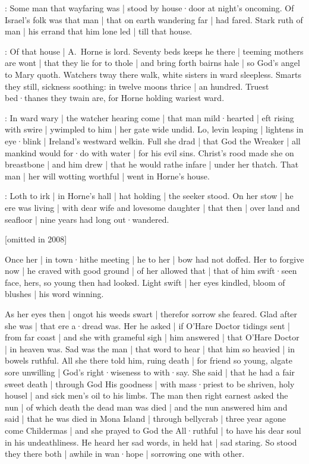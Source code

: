 

:
Some man that wayfaring was |
stood by house·door at night's oncoming.
Of Israel's folk was that man |
that on earth wandering far |
had fared.
Stark ruth of man |
his errand that him lone led |
till that house.


:
Of that house |
A.~Horne is lord.
Seventy beds keeps he there |
teeming mothers are wont |
that they lie for to thole |
and bring forth bairns hale |
so God's angel to Mary quoth.
Watchers tway there walk,
white sisters in ward sleepless.
Smarts they still,
sickness soothing:
in twelve moons thrice |
an hundred.
Truest bed·thanes they twain are,
for Horne holding wariest ward.


:
In ward wary |
the watcher hearing come |
that man mild·hearted |
eft rising with swire |
ywimpled to him |
her gate wide undid.
Lo,
levin leaping |
lightens in eye·blink |
Ireland's westward welkin.
Full she drad |
that God the Wreaker |
all mankind would for·do with water |
for his evil sins.
Christ's rood made she on breastbone |
and him drew |
that he would rathe infare |
under her thatch.
That man |
her will wotting worthful |
went in Horne's house.



:
Loth to irk |
in Horne's hall |
hat holding |
the seeker stood.
On her stow |
he ere was living |
with dear wife and lovesome daughter |
that then |
over land and seafloor |
nine years had long out·wandered.

[omitted in 2008]

Once her |
in town·hithe meeting |
he to her |
bow had not doffed.
Her to forgive now |
he craved with good ground |
of her allowed that |
that of him swift·seen face,
hers,
so young then had looked.
Light swift |
her eyes kindled,
bloom of blushes |
his word winning.


As her eyes then |
ongot his weeds swart |
therefor sorrow she feared.
Glad after she was |
that ere a·dread was.
Her he asked |
if O'Hare Doctor tidings sent |
from far coast |
and she with grameful sigh |
him answered |
that O'Hare Doctor |
in heaven was.
Sad was the man |
that word to hear |
that him so heavied |
in bowels ruthful.
All she there told him,
ruing death |
for friend so young,
algate sore unwilling |
God's right·wiseness to with·say.
She said |
that he had a fair sweet death |
through God His goodness |
with mass·priest to be shriven,
holy housel |
and sick men's oil to his limbs.
The man then right earnest asked the nun |
of which death the dead man was died |
and the nun answered him and said |
that he was died in Mona Island |
through bellycrab |
three year agone come Childermas |
and she prayed to God the All·ruthful |
to have his dear soul in his undeathliness.
He heard her sad words,
in held hat |
sad staring.
So stood they there both |
awhile in wan·hope |
sorrowing one with other.

